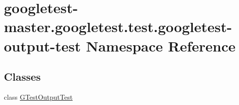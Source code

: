 \hypertarget{namespacegoogletest-master_1_1googletest_1_1test_1_1googletest-output-test}{}\section{googletest-\/master.googletest.\+test.\+googletest-\/output-\/test Namespace Reference}
\label{namespacegoogletest-master_1_1googletest_1_1test_1_1googletest-output-test}
\subsection*{Classes}
\begin{DoxyCompactItemize}
\item 
class \mbox{\hyperlink{classgoogletest-master_1_1googletest_1_1test_1_1googletest-output-test_1_1_g_test_output_test}{G\+Test\+Output\+Test}}
\end{DoxyCompactItemize}
